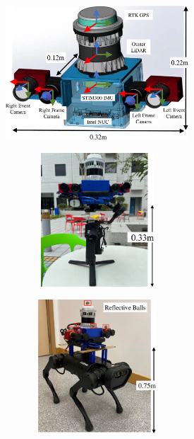\begin{figure}[!ht]
\centering
\begin{subfigure}{0.4\textwidth}
    \centering
    \includegraphics[width=0.8\textwidth, height=5cm]{figure/pqe/methodology/handheld_device-crop.pdf}
    \caption{}
\end{subfigure}
\centering
\begin{subfigure}{0.4\textwidth}
    \centering
    \includegraphics[width=0.8\textwidth, height=5cm]{figure/pqe/methodology/handheld_2-crop.pdf}
    \caption{}
\end{subfigure}
\begin{subfigure}{0.4\textwidth}
    \centering
    \includegraphics[width=0.8\textwidth, height=5cm]{figure/pqe/methodology/robotdog-crop.pdf}
    \caption{}
\end{subfigure}

\end{figure}
